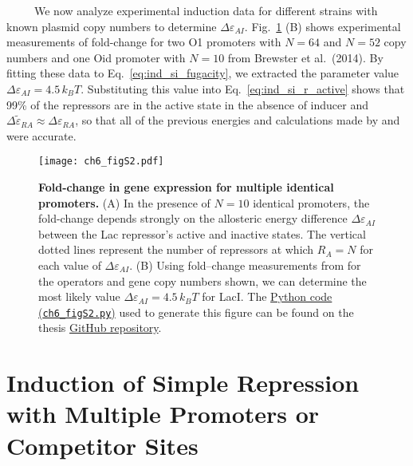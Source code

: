 \documentclass[12pt]{caltech_thesis}
\begin{document}
~~~~~We now analyze experimental induction data for different strains
with known plasmid copy numbers to determine \(\Delta\varepsilon_{AI}\).
Fig.~\ref{fig:fugacity} (B) shows experimental measurements of
fold-change for two O1 promoters with \(N=64\) and \(N=52\) copy numbers
and one Oid promoter with \(N=10\) from Brewster et al.~(2014). By
fitting these data to Eq.~\ref{eq:ind_si_fugacity}, we extracted the
parameter value \(\Delta\varepsilon_{AI} = 4.5\,k_B T\). Substituting
this value into Eq.~\ref{eq:ind_si_r_active} shows that 99\% of the
repressors are in the active state in the absence of inducer and
\(\Delta\tilde{\varepsilon}_{RA} \approx \Delta\varepsilon_{RA}\), so
that all of the previous energies and calculations made by
\textcite{garcia2011} and \textcite{brewster2014} were accurate.

\hypertarget{fig:fugacity}{%
\begin{figure}
\centering
\texttt{[image: ch6\_figS2.pdf]}
\caption[{Fold-change in gene expression for multiple identical
promoters.}]{\textbf{Fold-change in gene expression for multiple
identical promoters.} (A) In the presence of \(N=10\) identical
promoters, the fold-change depends strongly on the allosteric energy
difference \(\Delta\varepsilon_{AI}\) between the Lac repressor's active
and inactive states. The vertical dotted lines represent the number of
repressors at which \(R_A = N\) for each value of
\(\Delta\varepsilon_{AI}\). (B) Using fold--change measurements from
\textcite{brewster2014} for the operators and gene copy numbers shown,
we can determine the most likely value
\(\Delta\varepsilon_{AI} = 4.5\, k_BT\) for LacI. The
\href{https://github.com/gchure/phd/blob/master/src/chapter_06/code/ch6_figS2.py}{Python
code (\texttt{ch6\_figS2.py})} used to generate this figure can be found
on the thesis \href{https://github.com/gchure/phd}{GitHub repository}.}
\label{fig:fugacity}
\end{figure}
}

\hypertarget{induction-of-simple-repression-with-multiple-promoters-or-competitor-sites}{%
\section{Induction of Simple Repression with Multiple Promoters or
Competitor
Sites}\label{induction-of-simple-repression-with-multiple-promoters-or-competitor-sites}}
\end{document}
